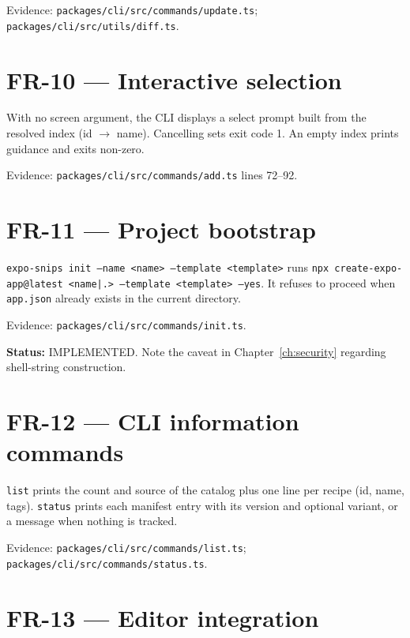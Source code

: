 Evidence: \texttt{packages/cli/src/commands/update.ts};
\texttt{packages/cli/src/utils/diff.ts}.

\section{FR-10 --- Interactive selection}

With no screen argument, the CLI displays a select prompt built from the resolved
index (id $\rightarrow$ name). Cancelling sets exit code 1. An empty index prints
guidance and exits non-zero.

Evidence: \texttt{packages/cli/src/commands/add.ts} lines 72--92.

\section{FR-11 --- Project bootstrap}

\texttt{expo-snips init --name <name> --template <template>} runs
\texttt{npx create-expo-app@latest <name|.> --template <template> --yes}. It
refuses to proceed when \texttt{app.json} already exists in the current directory.

Evidence: \texttt{packages/cli/src/commands/init.ts}.

\textbf{Status:} IMPLEMENTED. Note the caveat in
Chapter~\ref{ch:security} regarding shell-string construction.

\section{FR-12 --- CLI information commands}

\texttt{list} prints the count and source of the catalog plus one line per recipe
(id, name, tags). \texttt{status} prints each manifest entry with its version and
optional variant, or a message when nothing is tracked.

Evidence: \texttt{packages/cli/src/commands/list.ts};
\texttt{packages/cli/src/commands/status.ts}.

\section{FR-13 --- Editor integration}


